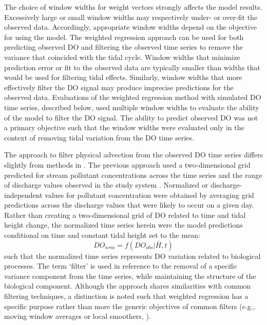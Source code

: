 \documentclass[letterpaper,12pt,oneside]{article}\usepackage[]{graphicx}\usepackage[]{color}
\begin{document}
The choice of window widths for weight vectors strongly affects the model results.  Excessively large or small window widths may respectively under- or over-fit the observed data.  Accordingly, appropriate window widths depend on the objective for using the model.  The weighted regression approach can be used for both predicting observed \ac{DO} and filtering the observed time series to remove the variance that coincided with the tidal cycle.  Window widths that minimize prediction error or fit to the observed data are typically smaller than widths that would be used for filtering tidal effects.  Similarly, window widths that more effectively filter the \ac{DO} signal may produce imprecise predictions for the observed data.  Evaluations of the weighted regression method with simulated \ac{DO} time series, described below, used multiple window widths to evaluate the ability of the model to filter the \ac{DO} signal.  The ability to predict observed \ac{DO} was not a primary objective such that the window widths were evaluated only in the context of removing tidal variation from the \ac{DO} time series.  

The approach to filter physical advection from the observed \ac{DO} time series differs slightly from methods in \citet{Hirsch10}.  The previous approach used a two-dimensional grid predicted for stream pollutant concentrations across the time series and the range of discharge values observed in the study system \citep{Hirsch10}.  Normalized or discharge-independent values for pollutant concentration were obtained by averaging grid predictions across the discharge values that were likely to occur on a given day.  Rather than creating a two-dimensional grid of \ac{DO} related to time and tidal height change, the normalized time series herein were the model predictions conditional on time and constant tidal height set to the mean:
\begin{equation} \label{do_nrm}
DO_{nrm} = f(DO_{obs}|\bar{H}, t)
\end{equation}
such that the normalized time series represents \ac{DO} variation related to biological processes.  The term `filter' is used in reference to the removal of a specific variance component from the time series, while maintaining the structure of the biological component.  Although the approach shares similarities with common filtering techniques, a distinction is noted such that weighted regression has a specific purpose rather than more the generic objectives of common filters (e.g., moving window averages or local smoothers, \citealt{Shumway11}).     
\end{document}

